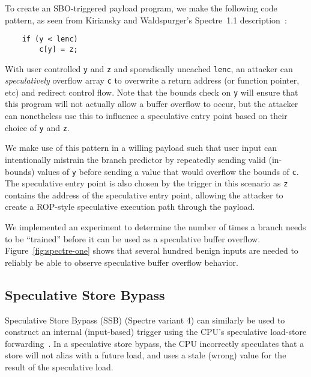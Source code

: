 
To create an SBO-triggered payload program, we make the following code pattern,
as seen from Kiriansky and Waldspurger's Spectre~1.1
description~\cite{kiransky2018speculative}:
\begin{lstlisting}
    if (y < lenc)
        c[y] = z;
\end{lstlisting}
With user controlled 
\texttt{y} and \texttt{z} and sporadically uncached \texttt{lenc}, an attacker 
can \textit{speculatively} overflow array \texttt{c}
to overwrite a return address (or function pointer, etc) and redirect control
flow. Note that the bounds check on \texttt{y} will ensure that this program
will not actually allow a buffer overflow to occur, but the attacker can
nonetheless use this to influence a speculative entry point based on their
choice of \texttt{y} and \texttt{z}.


We make use of this pattern in a willing payload such that user input can intentionally
mistrain the branch predictor by repeatedly sending valid (in-bounds) values of
\texttt{y} before sending a value that would overflow the bounds of \texttt{c}.
The speculative entry point is also chosen by the 
trigger in this scenario as \texttt{z} contains the address of the 
speculative entry point, allowing the attacker to create a ROP-style speculative 
execution path through the payload.

\FigSpectreOne
We implemented an experiment to determine the number of times a branch needs to
be ``trained'' before it can be used as a speculative buffer overflow.
Figure~\ref{fig:spectre-one} shows that several hundred benign inputs are needed
to reliably be able to observe speculative buffer overflow behavior.

\subsection{Speculative Store Bypass}

Speculative Store Bypass (SSB) (Spectre variant 4) can similarly be used to
construct an internal (input-based) trigger using the CPU's speculative
load-store forwarding~\cite{spec-store-bypass}. In a speculative store bypass,
the CPU incorrectly speculates that a store will not alias with a future load,
and uses a stale (wrong) value for the result of the speculative load.


